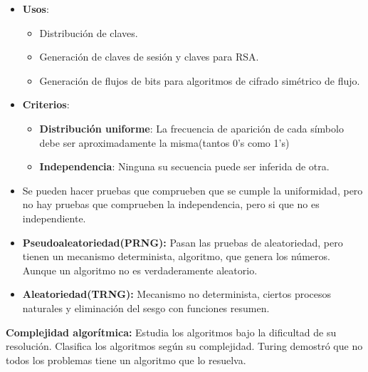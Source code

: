 \documentclass[12pt, twoside, openright]{report} %
\begin{document}
  \begin{itemize}
  \item \textbf{Usos}:
    

    \begin{itemize}
    \item Distribución de claves.
      
    \item Generación de claves de sesión y claves para RSA.
      
    \item Generación de flujos de bits para algoritmos de cifrado simétrico
      de flujo.
      
    \end{itemize}
  \item \textbf{Criterios}:
    

    \begin{itemize}
    \item \textbf{Distribución uniforme}: La frecuencia de aparición de cada
      símbolo debe ser aproximadamente la misma(tantos 0's como 1's)
      
    \item \textbf{Independencia}: Ninguna su secuencia puede ser inferida de
      otra.
      
    \end{itemize}
  \item Se pueden hacer pruebas que comprueben que se cumple la uniformidad,
    pero no hay pruebas que comprueben la independencia, pero si que no
    es independiente.
    
  \item \textbf{Pseudoaleatoriedad(PRNG):} Pasan las pruebas de
    aleatoriedad, pero tienen un mecanismo determinista, algoritmo, que
    genera los números. Aunque un algoritmo no es verdaderamente
    aleatorio.
    
  \item \textbf{Aleatoriedad(TRNG):} Mecanismo no determinista, ciertos
    procesos naturales y eliminación del sesgo con funciones resumen.
    
  \end{itemize}

  
  \textbf{Complejidad algorítmica:} Estudia los algoritmos bajo la
  dificultad de su resolución. Clasifica los algoritmos según su
  complejidad. Turing demostró que no todos los problemas tiene un
  algoritmo que lo resuelva.
  
\end{document}
